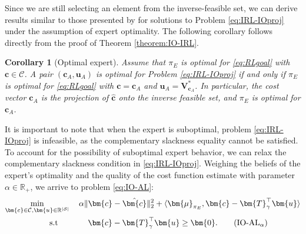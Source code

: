 \documentclass[10pt]{article} %
\newtheorem{corollary}{Corollary}
\def\C{\ensuremath{\mathcal{C}}}
\def\mTg{{\bm{T}}_\gamma}
\def\vzero{{\bm{0}}}
\def\vc{{\bm{c}}}
\def\vu{{\bm{u}}}
\def\vV{{\bm{V}}}
\def\vmu{{\bm{\mu}}}
\newcommand{\R}{\mathbb{R}}
\newcommand{\St}{\mathcal{S}}
\begin{document}
Since we are still selecting an element from the inverse-feasible set, we can derive results similar to those presented by \cite{Kamoutsi2021} for solutions to Problem \eqref{eq:IRL-IOproj} under the assumption of expert optimality. The following corollary follows directly from the proof of Theorem \ref{theorem:IO-IRL}. %
\begin{corollary}[Optimal expert] \label{cor:optimalExpert}
    Assume that $\pi_E$ is optimal for \eqref{eq:RLgoal} with $\vc\in\C$. A pair $(\vc_A,\vu_A)$ is optimal for Problem \eqref{eq:IRL-IOproj} if and only if $\pi_E$ is optimal for \eqref{eq:RLgoal} with $\vc=\vc_A$ and $\vu_A = \vV_{\vc_A}^*$. In particular, the cost vector $\vc_A$ is the projection of $\hat{\vc}$ onto the inverse feasible set, and $\pi_E$ is optimal for $\vc_A$.
\end{corollary}

It is important to note that when the expert is suboptimal, problem \eqref{eq:IRL-IOproj} is infeasible, as the complementary slackness equality cannot be satisfied. To account for the possibility of suboptimal expert behavior, we can relax the complementary slackness condition in \eqref{eq:IRL-IOproj}. Weighing the beliefs of the expert's optimality and the quality of the cost function estimate with parameter $\alpha\in\R_{+}$, we arrive to problem \eqref{eq:IO-AL}:
\begin{align*}
\min\limits_{\vc\in \C, \vu \in \R^{|\St|} } \quad \alpha\Vert \vc - \hat{\vc} \Vert^2_2& + \langle \vmu_{\pi_E}, \vc - \mTg^\top \vu \rangle
 \\
\text{s.t} \quad \quad \quad \hspace{7px} \vc - \mTg^\top& \vu \geq \vzero. \tag{$\text{IO-AL}_\alpha$} \label{eq:IO-AL}
\end{align*}
\end{document}
